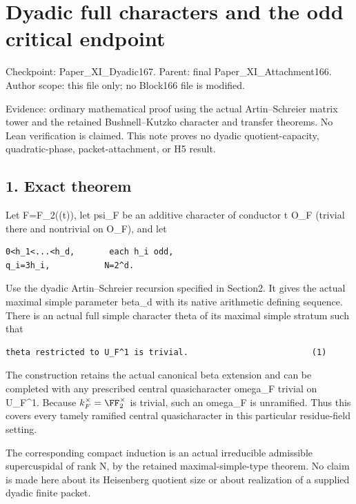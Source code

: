 \clearpage
\section{Dyadic full characters and the odd critical endpoint}\label{app:dyadic_character}

Checkpoint: Paper\_XI\_Dyadic167. Parent: final
Paper\_XI\_Attachment166. Author scope: this file only; no Block166 file
is modified.

Evidence: ordinary mathematical proof using the actual Artin--Schreier
matrix tower and the retained Bushnell--Kutzko character and transfer
theorems. No Lean verification is claimed. This note proves no dyadic
quotient-capacity, quadratic-phase, packet-attachment, or H5 result.

\hypertarget{dyadic_character-exact-theorem}{%
\subsection{1. Exact theorem}\label{dyadic_character-exact-theorem}}

Let F=F\_2((t)), let psi\_F be an additive character of conductor t O\_F
(trivial there and nontrivial on O\_F), and let

\begin{Verbatim}[fontsize=\small,breaklines=true,breakanywhere=true]
0<h_1<...<h_d,       each h_i odd,
q_i=3h_i,           N=2^d.
\end{Verbatim}

Use the dyadic Artin--Schreier recursion specified in Section2. It gives
the actual maximal simple parameter beta\_d with its native arithmetic
defining sequence. There is an actual full simple character theta of its
maximal simple stratum such that

\begin{Verbatim}[fontsize=\small,breaklines=true,breakanywhere=true]
theta restricted to U_F^1 is trivial.                         (1)
\end{Verbatim}

The construction retains the actual canonical beta extension and can be
completed with any prescribed central quasicharacter omega\_F trivial on
U\_F\^{}1. Because \(k_F^\times=\FF_2^\times\) is trivial,
such an omega\_F is unramified. Thus this covers every tamely ramified
central quasicharacter in this particular residue-field setting.

The corresponding compact induction is an actual irreducible admissible
supercuspidal of rank N, by the retained maximal-simple-type theorem. No
claim is made here about its Heisenberg quotient size or about
realization of a supplied dyadic finite packet.

